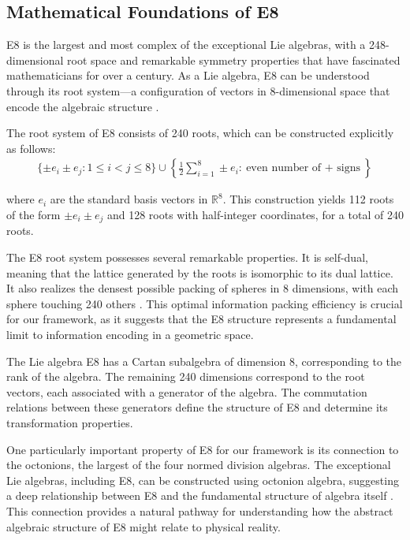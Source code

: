 \documentclass[11pt,english,twoside]{article}
\begin{document}
\subsection{Mathematical Foundations of E8}

E8 is the largest and most complex of the exceptional Lie algebras, with a 248-dimensional root space and remarkable symmetry properties that have fascinated mathematicians for over a century. As a Lie algebra, E8 can be understood through its root system---a configuration of vectors in 8-dimensional space that encode the algebraic structure \cite{Kac1990}.

The root system of E8 consists of 240 roots, which can be constructed explicitly as follows:
\begin{align}
    \{\pm e_i \pm e_j : 1 \leq i < j \leq 8\} \cup \left\{\frac{1}{2}\sum_{i=1}^{8}\pm e_i : \text{even number of $+$ signs}\right\}
\end{align}

where $e_i$ are the standard basis vectors in $\mathbb{R}^8$. This construction yields 112 roots of the form $\pm e_i \pm e_j$ and 128 roots with half-integer coordinates, for a total of 240 roots.

The E8 root system possesses several remarkable properties. It is self-dual, meaning that the lattice generated by the roots is isomorphic to its dual lattice. It also realizes the densest possible packing of spheres in 8 dimensions, with each sphere touching 240 others \cite{Conway1982}. This optimal information packing efficiency is crucial for our framework, as it suggests that the E8 structure represents a fundamental limit to information encoding in a geometric space.

The Lie algebra E8 has a Cartan subalgebra of dimension 8, corresponding to the rank of the algebra. The remaining 240 dimensions correspond to the root vectors, each associated with a generator of the algebra. The commutation relations between these generators define the structure of E8 and determine its transformation properties.

One particularly important property of E8 for our framework is its connection to the octonions, the largest of the four normed division algebras. The exceptional Lie algebras, including E8, can be constructed using octonion algebra, suggesting a deep relationship between E8 and the fundamental structure of algebra itself \cite{Baez2002}. This connection provides a natural pathway for understanding how the abstract algebraic structure of E8 might relate to physical reality.
\end{document}
